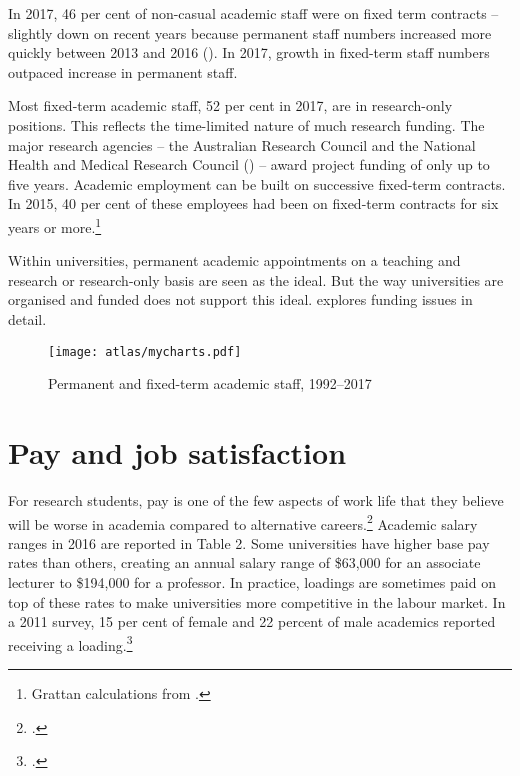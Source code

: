 \documentclass{grattan}
\begin{document}
In 2017, 46 per cent of non-casual academic staff were on fixed term contracts -- slightly down on recent years because permanent staff numbers increased more quickly between 2013 and 2016 (). In 2017, growth in fixed-term staff numbers outpaced increase in permanent staff.

Most fixed-term academic staff, 52 per cent in 2017, are in research-only positions. This reflects the time-limited nature of much research funding. The major research agencies -- the Australian Research Council and the National Health and Medical Research Council () -- award project funding of only up to five years. Academic employment can be built on successive fixed-term contracts. In 2015, 40 per cent of these employees had been on fixed-term contracts for six years or more.\footnote{Grattan calculations from \textcite[][4]{NTEU2016stateofunisurvey}.}

Within universities, permanent academic appointments on a teaching and research or research-only basis are seen as the ideal. But the way universities are organised and funded does not support this ideal.  explores funding issues in detail.

    \begin{figure} %
    \caption{Permanent and fixed-term academic staff, 1992--2017}\label{fig:permanent-and-fixedterm-academic-staff-19922017}
    \texttt{[image: atlas/mycharts.pdf]}
    \end{figure}


%
\section{Pay and job satisfaction}\label{sec:pay-and-job-satisfaction}

For research students, pay is one of the few aspects of work life that they believe will be worse in academia compared to alternative careers.\footcite[][39]{Edwards2011regeneratingtheac} Academic salary ranges in 2016 are reported in Table 2. Some universities have higher base pay rates than others, creating an annual salary range of \$63,000 for an associate lecturer to \$194,000 for a professor. In practice, loadings are sometimes paid on top of these rates to make universities more competitive in the labour market. In a 2011 survey, 15 per cent of female and 22 percent of male academics reported receiving a loading.\footcite[][56]{Strachan2012workandcareersin}
\end{document}
